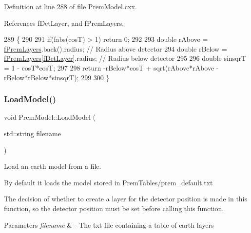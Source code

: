 Definition at line 288 of file Prem\+Model.\+cxx.



References f\+Det\+Layer, and f\+Prem\+Layers.


\begin{DoxyCode}
289 \{
290 
291   \textcolor{keywordflow}{if}(fabs(cosT) > 1) \textcolor{keywordflow}{return} 0;
292 
293   \textcolor{keywordtype}{double} rAbove = \hyperlink{classOscProb_1_1PremModel_a19a9a3b23ec154ad7a29f92b74aa5bc6}{fPremLayers}.back().radius;     \textcolor{comment}{// Radius above detector}
294   \textcolor{keywordtype}{double} rBelow = \hyperlink{classOscProb_1_1PremModel_a19a9a3b23ec154ad7a29f92b74aa5bc6}{fPremLayers}[\hyperlink{classOscProb_1_1PremModel_a4fb68506493666349f418b893a996185}{fDetLayer}].radius; \textcolor{comment}{// Radius below detector}
295 
296   \textcolor{keywordtype}{double} sinsqrT = 1 - cosT*cosT;
297 
298   \textcolor{keywordflow}{return} -rBelow*cosT + sqrt(rAbove*rAbove - rBelow*rBelow*sinsqrT);
299 
300 \}
\end{DoxyCode}
\mbox{\label{classOscProb_1_1PremModel_a6363a5e711dd8b0d2e684677e585b293}} 
\subsubsection{\texorpdfstring{Load\+Model()}{LoadModel()}}
{\footnotesize\ttfamily void Prem\+Model\+::\+Load\+Model (\begin{DoxyParamCaption}\item[{std\+::string}]{filename }\end{DoxyParamCaption})\hspace{0.3cm}{\ttfamily [virtual]}}

Load an earth model from a file.

By default it loads the model stored in Prem\+Tables/prem\+\_\+default.\+txt

The decision of whether to create a layer for the detector position is made in this function, so the detector position must be set before calling this function.


\begin{DoxyParams}{Parameters}
{\em filename} & -\/ The txt file containing a table of earth layers \\
\hline
\end{DoxyParams}


